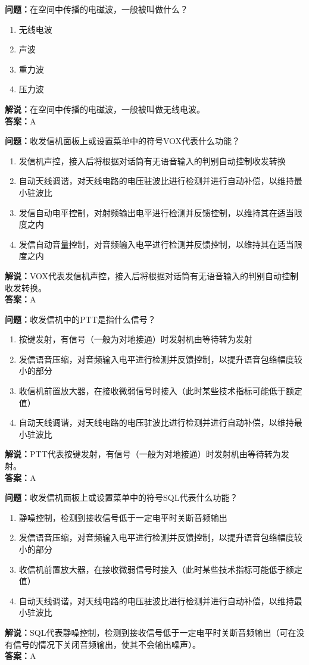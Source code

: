 \documentclass{ctexbook}%
\begin{document}
\textbf{问题：}在空间中传播的电磁波，一般被叫做什么？
\begin{enumerate}[label=\Alph*), leftmargin=3em]
\item 无线电波
\item 声波
\item 重力波
\item 压力波
\end{enumerate}
\textbf{解说：}在空间中传播的电磁波，一般被叫做无线电波。\\
\textbf{答案：}A

\textbf{问题：}收发信机面板上或设置菜单中的符号VOX代表什么功能？
\begin{enumerate}[label=\Alph*), leftmargin=3em]
\item 发信机声控，接入后将根据对话筒有无语音输入的判别自动控制收发转换
\item 自动天线调谐，对天线电路的电压驻波比进行检测并进行自动补偿，以维持最小驻波比
\item 发信自动电平控制，对射频输出电平进行检测并反馈控制，以维持其在适当限度之内
\item 发信自动音量控制，对音频输入电平进行检测并反馈控制，以维持其在适当限度之内
\end{enumerate}
\textbf{解说：}VOX代表发信机声控，接入后将根据对话筒有无语音输入的判别自动控制收发转换。\\
\textbf{答案：}A

\textbf{问题：}收发信机中的PTT是指什么信号？
\begin{enumerate}[label=\Alph*), leftmargin=3em]
\item 按键发射，有信号（一般为对地接通）时发射机由等待转为发射
\item 发信语音压缩，对音频输入电平进行检测并反馈控制，以提升语音包络幅度较小的部分
\item 收信机前置放大器，在接收微弱信号时接入（此时某些技术指标可能低于额定值）
\item 自动天线调谐，对天线电路的电压驻波比进行检测并进行自动补偿，以维持最小驻波比
\end{enumerate}
\textbf{解说：}PTT代表按键发射，有信号（一般为对地接通）时发射机由等待转为发射。\\
\textbf{答案：}A

\textbf{问题：}收发信机面板上或设置菜单中的符号SQL代表什么功能？
\begin{enumerate}[label=\Alph*), leftmargin=3em]
\item 静噪控制，检测到接收信号低于一定电平时关断音频输出
\item 发信语音压缩，对音频输入电平进行检测并反馈控制，以提升语音包络幅度较小的部分
\item 收信机前置放大器，在接收微弱信号时接入（此时某些技术指标可能低于额定值）
\item 自动天线调谐，对天线电路的电压驻波比进行检测并进行自动补偿，以维持最小驻波比
\end{enumerate}
\textbf{解说：}SQL代表静噪控制，检测到接收信号低于一定电平时关断音频输出（可在没有信号的情况下关闭音频输出，使其不会输出噪声）。\\
\textbf{答案：}A
\end{document}
